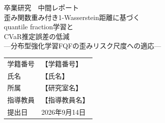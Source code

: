 \documentclass[a4paper,10pt]{jsarticle}
\title{\vspace{-1cm}}
\author{}
\date{}
\theoremstyle{definition}
\begin{document}
\begin{titlepage}
\begin{center}
\vspace*{3cm}
{\LARGE 卒業研究　中間レポート}\\[1.5cm]
{\Large 歪み関数重み付き1-Wasserstein距離に基づく\\[0.3cm]
quantile fraction学習と\\[0.3cm]
CVaR推定誤差の低減}\\[0.6cm]
{\large ---分布型強化学習FQFの歪みリスク尺度への適応---}\\[3cm]

\begin{tabular}{ll}
学籍番号 & 【学籍番号】\\[0.3cm]
氏名 & 【氏名】\\[0.3cm]
所属 & 【研究室名】\\[0.3cm]
指導教員 & 【指導教員名】\\[0.3cm]
提出日 & 2026年9月14日\\
\end{tabular}
\vfill
\end{center}
\end{titlepage}

\tableofcontents
\newpage

\end{document}
